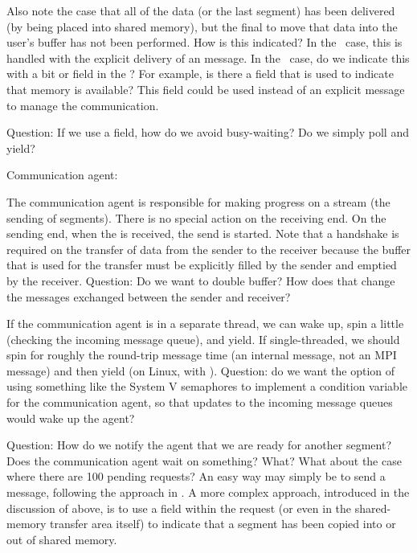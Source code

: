 \begin{mmadi}
\begin{shmem}
Also note the case that all of the data (or the last segment) has been
delivered (by being placed 
into shared memory), but the final  to move that data
into the user's buffer has not been performed.  How is this indicated?  In the
\tcpname\ case, this is handled with the explicit delivery of an
 message.  In the \shmemname\ case, do we indicate
this with a bit or field in the ?  For example, is
there a  field that is used to indicate
that memory is available?  This field could be used instead of an explicit
message to manage the communication.  

Question: If we use a  field, how do we avoid
busy-waiting?  Do we simply poll and yield?

Communication agent:

The communication agent is responsible for making progress on a stream (the
sending of segments).  There is no special action on the receiving end.  On
the sending end, when the  is received, the
send is started.  Note that a handshake is required on the transfer of data
from the sender to the receiver because the buffer that is used for the
transfer must be explicitly filled by the sender and emptied by the receiver.
Question: Do we want to double buffer?  How does that change the messages
exchanged between the sender and receiver?

If the communication agent is in a separate thread, we can wake up, spin a
little (checking the incoming message queue), and yield.  If single-threaded,
we should spin for roughly the round-trip message time (an internal message,
not an MPI message) and then yield (on Linux, with ).
Question: do we want the option of using something like the System V
semaphores to implement a condition variable for the communication agent, so
that updates to the incoming message queues would wake up the agent?

Question: How do we notify the agent that we are ready for another segment?
Does the communication agent wait on something?  What?  What about the case
where there are 100 pending requests?
An easy way may simply be to send a message, following the approach in
\tcpname.  A more complex approach, introduced in the discussion of
 above, is to use a field within the request (or even in the
shared-memory transfer area itself) to indicate that a segment has been copied
into or out of shared memory.  


\end{shmem}
\end{mmadi}
